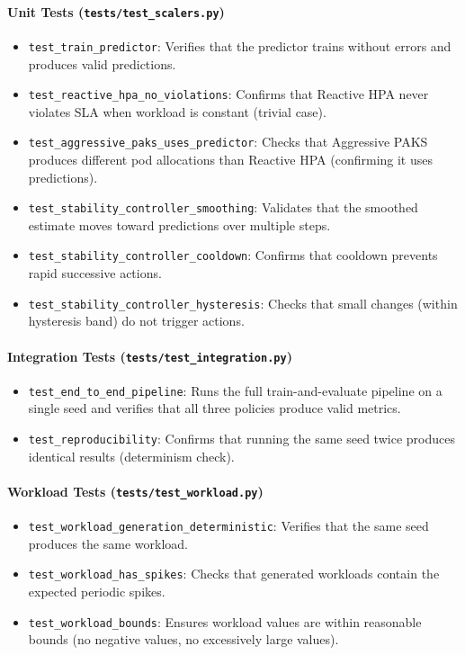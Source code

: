 \paragraph{Unit Tests (\texttt{tests/test\_scalers.py})}
\begin{itemize}
  \item \texttt{test\_train\_predictor}: Verifies that the predictor trains without errors and produces valid predictions.
  \item \texttt{test\_reactive\_hpa\_no\_violations}: Confirms that Reactive HPA never violates SLA when workload is constant (trivial case).
  \item \texttt{test\_aggressive\_paks\_uses\_predictor}: Checks that Aggressive PAKS produces different pod allocations than Reactive HPA (confirming it uses predictions).
  \item \texttt{test\_stability\_controller\_smoothing}: Validates that the smoothed estimate moves toward predictions over multiple steps.
  \item \texttt{test\_stability\_controller\_cooldown}: Confirms that cooldown prevents rapid successive actions.
  \item \texttt{test\_stability\_controller\_hysteresis}: Checks that small changes (within hysteresis band) do not trigger actions.
\end{itemize}

\paragraph{Integration Tests (\texttt{tests/test\_integration.py})}
\begin{itemize}
  \item \texttt{test\_end\_to\_end\_pipeline}: Runs the full train-and-evaluate pipeline on a single seed and verifies that all three policies produce valid metrics.
  \item \texttt{test\_reproducibility}: Confirms that running the same seed twice produces identical results (determinism check).
\end{itemize}

\paragraph{Workload Tests (\texttt{tests/test\_workload.py})}
\begin{itemize}
  \item \texttt{test\_workload\_generation\_deterministic}: Verifies that the same seed produces the same workload.
  \item \texttt{test\_workload\_has\_spikes}: Checks that generated workloads contain the expected periodic spikes.
  \item \texttt{test\_workload\_bounds}: Ensures workload values are within reasonable bounds (no negative values, no excessively large values).
\end{itemize}

